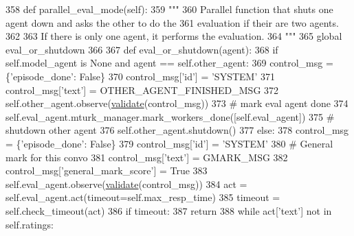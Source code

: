 \begin{DoxyCode}
358     \textcolor{keyword}{def }parallel\_eval\_mode(self):
359         \textcolor{stringliteral}{"""}
360 \textcolor{stringliteral}{        Parallel function that shuts one agent down and asks the other to do the}
361 \textcolor{stringliteral}{        evaluation if their are two agents.}
362 \textcolor{stringliteral}{}
363 \textcolor{stringliteral}{        If there is only one agent, it performs the evaluation.}
364 \textcolor{stringliteral}{        """}
365         \textcolor{keyword}{global} eval\_or\_shutdown
366 
367         \textcolor{keyword}{def }eval\_or\_shutdown(agent):
368             \textcolor{keywordflow}{if} self.model\_agent \textcolor{keywordflow}{is} \textcolor{keywordtype}{None} \textcolor{keywordflow}{and} agent == self.other\_agent:
369                 control\_msg = \{\textcolor{stringliteral}{'episode\_done'}: \textcolor{keyword}{False}\}
370                 control\_msg[\textcolor{stringliteral}{'id'}] = \textcolor{stringliteral}{'SYSTEM'}
371                 control\_msg[\textcolor{stringliteral}{'text'}] = OTHER\_AGENT\_FINISHED\_MSG
372                 self.other\_agent.observe(\hyperlink{namespaceparlai_1_1core_1_1worlds_afc3fad603b7bce41dbdc9cdc04a9c794}{validate}(control\_msg))
373                 \textcolor{comment}{# mark eval agent done}
374                 self.eval\_agent.mturk\_manager.mark\_workers\_done([self.eval\_agent])
375                 \textcolor{comment}{# shutdown other agent}
376                 self.other\_agent.shutdown()
377             \textcolor{keywordflow}{else}:
378                 control\_msg = \{\textcolor{stringliteral}{'episode\_done'}: \textcolor{keyword}{False}\}
379                 control\_msg[\textcolor{stringliteral}{'id'}] = \textcolor{stringliteral}{'SYSTEM'}
380                 \textcolor{comment}{# General mark for this convo}
381                 control\_msg[\textcolor{stringliteral}{'text'}] = GMARK\_MSG
382                 control\_msg[\textcolor{stringliteral}{'general\_mark\_score'}] = \textcolor{keyword}{True}
383                 self.eval\_agent.observe(\hyperlink{namespaceparlai_1_1core_1_1worlds_afc3fad603b7bce41dbdc9cdc04a9c794}{validate}(control\_msg))
384                 act = self.eval\_agent.act(timeout=self.max\_resp\_time)
385                 timeout = self.check\_timeout(act)
386                 \textcolor{keywordflow}{if} timeout:
387                     \textcolor{keywordflow}{return}
388                 \textcolor{keywordflow}{while} act[\textcolor{stringliteral}{'text'}] \textcolor{keywordflow}{not} \textcolor{keywordflow}{in} self.ratings:

\end{DoxyCode}
